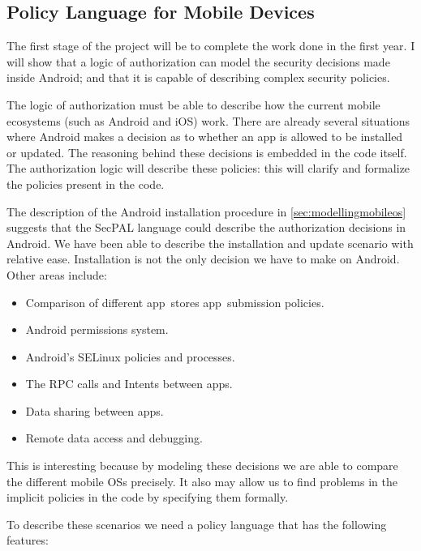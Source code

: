 \documentclass[a4paper,sfsidenotes]{%
  article%
}
\begin{document}
\subsection{Policy Language for Mobile Devices}
\label{sec:proposallang}

The first stage of the project will be to complete the work done in the first
year. I will show that a logic of authorization can model the security decisions
made inside Android; and that it is capable of describing complex security
policies. 

The logic of authorization must be able to describe how the current mobile
ecosystems (such as Android and iOS) work.  There are already several situations
where Android makes a decision as to whether an app is allowed to be installed
or updated.  The reasoning behind these decisions is embedded in the code
itself.  The authorization logic will describe these policies: this
will clarify and formalize the policies present in the code.

The description of the Android installation procedure in
\autoref{sec:modellingmobileos} suggests that the SecPAL language could
describe the authorization decisions in Android. We have been able to describe
the installation and update scenario with relative ease.  Installation is not
the only decision we have to make on Android. Other areas include:

\begin{itemize}
  \item Comparison of different app~stores app~submission policies.
  \item Android permissions system.
  \item Android's SELinux policies and processes.
  \item The \ac{RPC} calls and Intents between apps.
  \item Data sharing between apps.
  \item Remote data access and debugging.
\end{itemize}

This is interesting because by modeling these decisions we are able to
compare the different mobile OSs precisely.  It also may allow us to find
problems in the implicit policies in the code by specifying them formally.

To describe these scenarios we need a policy language that has the following
features:
\end{document}
